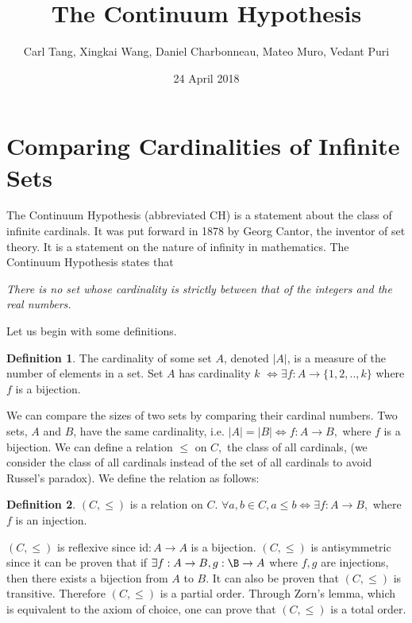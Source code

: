 \documentclass[12pt]{article}
\title{\bf The Continuum Hypothesis}
\author{ Carl Tang, Xingkai Wang, Daniel Charbonneau, Mateo Muro, Vedant Puri
}
\date{24 April 2018}
\theoremstyle{definition}
\newtheorem{definition}{Definition}[section]
\begin{document}
\maketitle

\tableofcontents

\newpage


\section{Comparing Cardinalities of Infinite Sets}
The Continuum Hypothesis (abbreviated CH) is a statement about the class of infinite cardinals. It was put forward in 1878 by Georg Cantor, the inventor of set theory. It is a statement on the nature of infinity in mathematics. The Continuum Hypothesis states that
\begin{center}
    \textit{
    There is no set whose cardinality is strictly between that of the integers and the real numbers.
    }
\end{center}

\noindent Let us begin with some definitions.
\begin{definition}
    The cardinality of some set $A$, denoted $|A|$, is a measure of the number of elements in a set. Set $A$ has cardinality $k$ $\iff\exists f:A\to \{1,2,..,k\}$ where $f$ is a bijection.
\end{definition}

We can compare the sizes of two sets by comparing their cardinal numbers. Two sets, $A$ and $B$, have the same cardinality, i.e. $|A|=|B|\iff f:A\to B,$ where $f$ is a bijection. We can define a relation $\leq$ on $C,$ the class of all cardinals, (we consider the class of all cardinals instead of the set of all cardinals to avoid Russel's paradox). We define the relation as follows:

\begin{definition}
    $(C,\leq)$ is a relation on $C.$ $\forall a,b\in C, a\leq b \iff\exists f:A\to B,$ where $f$ is an injection.
\end{definition}

$(C,\leq)$ is reflexive since $\text{id}:A\to A$ is a bijection. $(C,\leq)$ is antisymmetric since it can be proven that if $\exists f:A\to B,g:\B\to A$ where $f, g$ are injections, then there exists a bijection from $A$ to $B.$ It can also be proven that $(C,\leq)$ is transitive. Therefore $(C,\leq)$ is a partial order. Through Zorn's lemma, which is equivalent to the axiom of choice, one can prove that $(C,\leq)$ is a total order.
\end{document}
